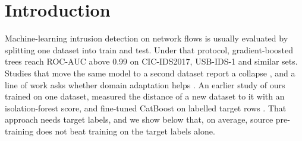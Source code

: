 \documentclass[11pt]{article}
\begin{document}
\section{Introduction}
Machine-learning intrusion detection on network flows is usually evaluated by splitting one dataset into train and test.
Under that protocol, gradient-boosted trees reach ROC-AUC above 0.99 on CIC-IDS2017, USB-IDS-1 and similar sets.
Studies that move the same model to a second dataset report a collapse \citep{layeghy2023explainable,cantone2024crossdataset,dhooge2020inter,apruzzese2022cross}, and a line of work asks whether domain adaptation helps \citep{layeghy2023dinids}.
An earlier study of ours trained on one dataset, measured the distance of a new dataset to it with an isolation-forest score, and fine-tuned CatBoost on labelled target rows \citep{dang2023learning}.
That approach needs target labels, and we show below that, on average, source pre-training does not beat training on the target labels alone.
\end{document}
